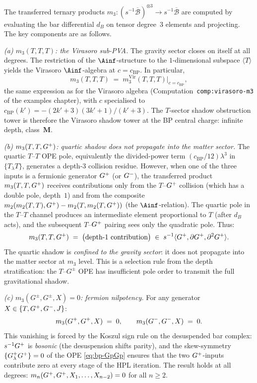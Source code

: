 \begin{computation}[The ordered bar complex of the
Bershadsky--Polyakov algebra
$\mathcal{B}^{k'} = W_{k'}(\mathfrak{sl}_3,f_{\min})$;
\ClaimStatusProvedHere]
The transferred ternary products
$m_3\colon (s^{-1}\overline{\mathcal{B}})^{\otimes 3}
\to s^{-1}\overline{\mathcal{B}}$ are computed by
evaluating the bar differential $d_B$ on tensor degree~$3$
elements and projecting. The key components are as follows.

\emph{(a) $m_3(T,T,T)$: the Virasoro sub-PVA.}
The gravity sector closes on itself at all degrees. The
restriction of the $\Ainf$-structure to the
$1$-dimensional subspace $\langle T\rangle$ yields the
Virasoro $\Ainf$-algebra at $c=c_{\mathrm{BP}}$.
In particular,
\begin{equation}\label{eq:bp-m3-TTT}
m_3(T,T,T)
\;=\;
m_3^{\mathrm{Vir}}(T,T,T)\big|_{c=c_{\mathrm{BP}}},
\end{equation}
the same expression as for the Virasoro algebra
(Computation~\texttt{comp:virasoro-m3} of the examples chapter),
with $c$ specialised to
$c_{\mathrm{BP}}(k')=-(2k'+3)(3k'+1)/(k'+3)$.
The $T$-sector shadow obstruction tower is therefore the Virasoro shadow
tower at the BP central charge: infinite depth,
class~$\mathbf{M}$.

\emph{(b) $m_3(T,T,G^+)$: quartic shadow does not propagate
into the matter sector.}
The quartic $T$--$T$ OPE pole, equivalently the divided-power
term $(c_{\mathrm{BP}}/12)\lambda^3$ in $\{T_\lambda T\}$,
generates a depth-$3$ collision residue.
However, when one of the three inputs is a fermionic
generator $G^+$ (or $G^-$), the transferred product
$m_3(T,T,G^+)$ receives contributions only from the
$T$--$G^+$ collision (which has a double pole,
depth~$1$) and from the composite
$m_2(m_2(T,T),G^+) - m_2(T,m_2(T,G^+))$ (the
$\Ainf$-relation). The quartic pole in the $T$--$T$
channel produces an intermediate element proportional to
$T$ (after $d_B$ acts), and the subsequent
$T$--$G^+$ pairing sees only the quadratic pole. Thus:
\begin{equation}\label{eq:bp-m3-TTGp}
m_3(T,T,G^+)
\;=\;
\bigl(\text{depth-$1$ contribution}\bigr)
\;\in\;
s^{-1}\langle G^+,\partial G^+,\partial^2G^+\rangle.
\end{equation}
The quartic shadow is \emph{confined to the gravity sector}:
it does not propagate into the matter sector at $m_3$ level.
This is a selection rule from the depth stratification:
the $T$--$G^\pm$ OPE has insufficient pole order to transmit
the full gravitational shadow.

\emph{(c) $m_3(G^\pm,G^\pm,X)=0$: fermion nilpotency.}
For any generator $X\in\{T,G^+,G^-,J\}$:
\begin{equation}\label{eq:bp-m3-fermion-nil}
m_3(G^+,G^+,X) \;=\; 0,
\qquad
m_3(G^-,G^-,X) \;=\; 0.
\end{equation}
This vanishing is forced by the Koszul sign rule on the
desuspended bar complex: $s^{-1}G^+$ is \emph{bosonic}
(the desuspension shifts parity), and the skew-symmetry
$\{G^+_\lambda G^+\}=0$ of the OPE
\eqref{eq:bp-GpGp} ensures that the two $G^+$-inputs
contribute zero at every stage of the HPL iteration.
The result holds at all degrees:
$m_n(G^+,G^+,X_1,\dots,X_{n-2})=0$ for all $n\ge 2$.


\end{computation}
